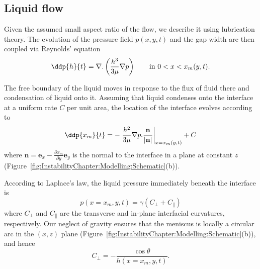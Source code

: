 


\subsection{Liquid flow}
Given the assumed small aspect ratio of the flow, we describe it using lubrication theory. The evolution of the pressure field $p(x,y,t)$ and the gap width are then coupled via Reynolds' equation
\begin{equation}\label{E:InstabilityChapter:Model:Liquid:Reynolds}
\ddp{h}{t} = \nabla.\left( \frac{h^3}{3\mu} \nabla p\right) \qquad \text{in}~0 < x < x_m(y,t).
\end{equation}

The free boundary of the liquid moves in response to the flux of fluid there and condensation of liquid onto it. Assuming that liquid condenses onto the interface at a uniform rate $C$ per unit area, the location of the interface evolves according to
\begin{equation}
\ddp{x_m}{t} = -\left.\frac{h^2}{3\mu}\nabla p .\frac{\mathbf{n}}{|\mathbf{n}|}\right|_{x = x_m(y,t)} + C
\end{equation}
where $\mathbf{n} = \mathbf{e}_x -\frac{\partial x_m}{\partial y}  \mathbf{e}_y$ is the normal to the interface in a plane at constant $z$ (Figure~\ref{fig:InstabilityChapter:Modelling:Schematic}(b)).

According to Laplace's law, the liquid pressure immediately beneath the interface is
\begin{equation}\label{E:InstabilityChapter:Model:Liquid:LaplaceBC}
 p(x = x_m, y,t) = \gamma\left(C_{\perp} + C_{\parallel}\right)
\end{equation}
where $C_{\perp}$ and $C_{\parallel}$ are the transverse and in-plane interfacial curvatures, respectively. Our neglect of gravity ensures that the meniscus is locally a circular arc in the $(x,z)$ plane (Figure~\ref{fig:InstabilityChapter:Modelling:Schematic}(b)), and hence
\begin{equation}\label{E:InstabilityChapter:Model:Liquid:CPerp}
C_{\perp} = -\frac{\cos \theta}{h(x=x_m,y,t)}.
\end{equation}

